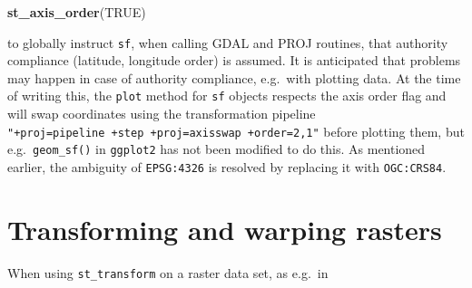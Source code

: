\documentclass[]{book}
\newenvironment{Shaded}{\begin{snugshade}}{\end{snugshade}}
\newcommand{\CommentTok}[1]{\textcolor[rgb]{0.56,0.35,0.01}{\textit{#1}}}
\newcommand{\DataTypeTok}[1]{\textcolor[rgb]{0.13,0.29,0.53}{#1}}
\newcommand{\DecValTok}[1]{\textcolor[rgb]{0.00,0.00,0.81}{#1}}
\newcommand{\KeywordTok}[1]{\textcolor[rgb]{0.13,0.29,0.53}{\textbf{#1}}}
\newcommand{\NormalTok}[1]{#1}
\newcommand{\OperatorTok}[1]{\textcolor[rgb]{0.81,0.36,0.00}{\textbf{#1}}}
\newcommand{\OtherTok}[1]{\textcolor[rgb]{0.56,0.35,0.01}{#1}}
\newcommand{\StringTok}[1]{\textcolor[rgb]{0.31,0.60,0.02}{#1}}
\begin{document}
\begin{Shaded}
\begin{Highlighting}[]
\KeywordTok{st_axis_order}\NormalTok{(}\OtherTok{TRUE}\NormalTok{)}
\end{Highlighting}
\end{Shaded}

to globally instruct \texttt{sf}, when calling GDAL and PROJ routines, that
authority compliance (latitude, longitude order) is assumed. It is
anticipated that problems may happen in case of authority compliance,
e.g.~with plotting data. At the time of writing this, the \texttt{plot}
method for \texttt{sf} objects respects the axis order flag and will swap
coordinates using the transformation pipeline \texttt{"+proj=pipeline\ +step\ +proj=axisswap\ +order=2,1"} before plotting them, but
e.g.~\texttt{geom\_sf()} in \texttt{ggplot2} has not been modified to do this.
As mentioned earlier, the ambiguity of \texttt{EPSG:4326} is resolved by
replacing it with \texttt{OGC:CRS84}.

\hypertarget{warp}{%
\section{Transforming and warping rasters}\label{warp}}

When using \texttt{st\_transform} on a raster data set, as e.g.~in

\begin{Shaded}
\end{Shaded}
\end{document}
